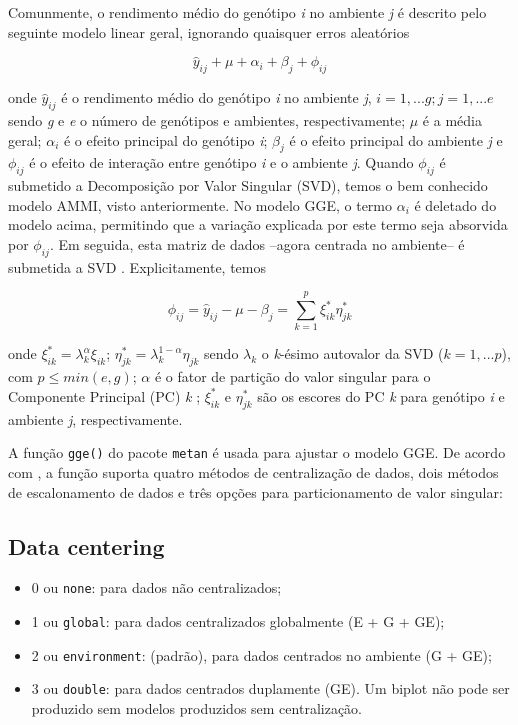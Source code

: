 \documentclass[
]{book}
\providecommand{\tightlist}{%
  \setlength{\itemsep}{0pt}\setlength{\parskip}{0pt}}
\begin{document}
Comunmente, o rendimento médio do genótipo \emph{i} no ambiente \emph{j} é descrito pelo seguinte modelo linear geral, ignorando quaisquer erros aleatórios

\[
\hat y_{ij} + \mu + \alpha_i + \beta_j + \phi_{ij}
\]

onde \(\hat y_{ij}\) é o rendimento médio do genótipo \emph{i} no ambiente \emph{j}, \(i = 1, ... g; j = 1, ... e\) sendo \emph{g} e \emph{e} o número de genótipos e ambientes, respectivamente; \(\mu\) é a média geral; \(\alpha_i\) é o efeito principal do genótipo \emph{i}; \(\beta_j\) é o efeito principal do ambiente \emph{j} e \(\phi_{ij}\) é o efeito de interação entre genótipo \emph{i} e o ambiente \emph{j}. Quando \(\phi_{ij}\) é submetido a Decomposição por Valor Singular (SVD), temos o bem conhecido modelo AMMI, visto anteriormente. No modelo GGE, o termo \(\alpha_i\) é deletado do modelo acima, permitindo que a variação explicada por este termo seja absorvida por \(\phi_{ij}\). Em seguida, esta matriz de dados --agora centrada no ambiente-- é submetida a SVD \citep{Yan2007, Yan2003}. Explicitamente, temos

\[
{\phi_{ij} =  \hat y_{ij}} - \mu - \beta_j  = \sum\limits_{k = 1}^p \xi_{ik}^*\eta_{jk}^*
\]

onde \(\xi_{ik}^* = \lambda_k^ \alpha \xi_{ik}\); \(\eta_{jk}^* = \lambda_k^{1-\alpha}\eta_{jk}\) sendo \(\lambda_k\) o \emph{k}-ésimo autovalor da SVD (\(k = 1, ... p\)), com \(p \le min (e, g)\); \(\alpha\) é o fator de partição do valor singular para o Componente Principal (PC) \emph{k} \citep{Yan2002b}; \(\xi_{ik}^*\) e \(\eta_{jk}^*\) são os escores do PC \emph{k} para genótipo \emph{i} e ambiente \emph{j}, respectivamente.

A função \texttt{gge()} do pacote \texttt{metan} é usada para ajustar o modelo GGE. De acordo com \citet{Yan2003}, a função suporta quatro métodos de centralização de dados, dois métodos de escalonamento de dados e três opções para particionamento de valor singular:

\hypertarget{data-centering}{%
\subsection{Data centering}\label{data-centering}}

\begin{itemize}
\tightlist
\item
  0 ou \texttt{none}: para dados não centralizados;
\item
  1 ou \texttt{global}: para dados centralizados globalmente (E + G + GE);
\item
  2 ou \texttt{environment}: (padrão), para dados centrados no ambiente (G + GE);
\item
  3 ou \texttt{double}: para dados centrados duplamente (GE). Um biplot não pode ser produzido sem modelos produzidos sem centralização.
\end{itemize}
\end{document}
